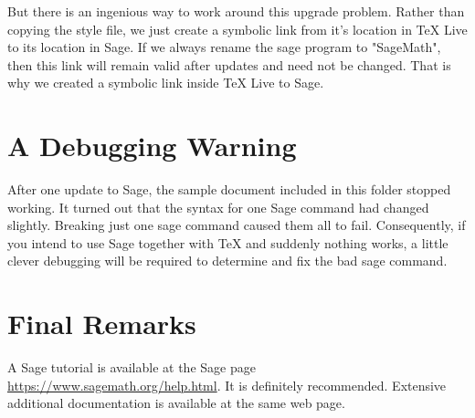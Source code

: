 \documentclass[11pt, oneside]{amsart}
\begin{document}
But there is an ingenious way to work around this upgrade problem. Rather than copying the style file, we just
create a symbolic link from it's location in TeX Live to its location in Sage. If we always rename the sage program to "SageMath", then this link will remain valid after updates and need not be changed. That is why we created a symbolic link inside TeX Live to Sage.

\section{A Debugging Warning}

After one update to Sage, the sample document included in this folder stopped working. It turned out that the syntax for one Sage command had changed slightly. Breaking just one sage command caused them all to fail. Consequently, if you intend to use Sage together with TeX and suddenly nothing works, a little clever debugging will be required to determine and fix the bad sage command.



\section{Final Remarks}
 
A Sage tutorial is available at the Sage page \url{https://www.sagemath.org/help.html}. It is definitely recommended. Extensive additional documentation is available at the same web page.
\end{document}
